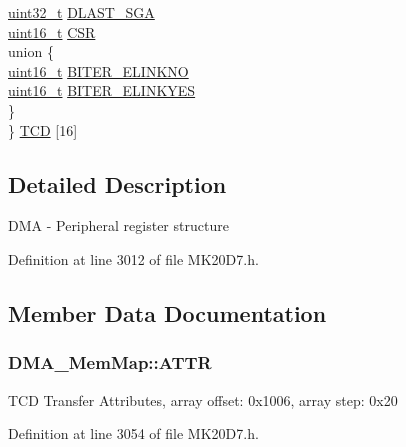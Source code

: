 \begin{DoxyCompactItemize}
\begin{tabbing}
\>\hyperlink{_p_e___types_8h_a33594304e786b158f3fb30289278f5af}{uint32\_t} \hyperlink{struct_d_m_a___mem_map_ace5b1452402cb8cd1863c10b0b8dc8bc}{DLAST\_SGA}\\
\>\hyperlink{_p_e___types_8h_a1f1825b69244eb3ad2c7165ddc99c956}{uint16\_t} \hyperlink{struct_d_m_a___mem_map_a3acaffbe8a6ec6cf0ba28d9e77a52aca}{CSR}\\
\>union \{\\
\>\>\hyperlink{_p_e___types_8h_a1f1825b69244eb3ad2c7165ddc99c956}{uint16\_t} \hyperlink{struct_d_m_a___mem_map_ab5a88bd570bf66e4186b2363c84bd015}{BITER\_ELINKNO}\\
\>\>\hyperlink{_p_e___types_8h_a1f1825b69244eb3ad2c7165ddc99c956}{uint16\_t} \hyperlink{struct_d_m_a___mem_map_a352e7d2300de3264c6a49f1ce813e149}{BITER\_ELINKYES}\\
\>\} \\
\} \hyperlink{struct_d_m_a___mem_map_a4c6dc939894da03763acff98bd17fa1c}{TCD} \mbox{[}16\mbox{]}\\

\end{tabbing}\end{DoxyCompactItemize}


\subsection{Detailed Description}
D\+MA -\/ Peripheral register structure 

Definition at line 3012 of file M\+K20\+D7.\+h.



\subsection{Member Data Documentation}
\subsubsection[{\texorpdfstring{A\+T\+TR}{ATTR}}]{ D\+M\+A\+\_\+\+Mem\+Map\+::\+A\+T\+TR}\hypertarget{struct_d_m_a___mem_map_ad79f464644f5998377c1a7f63fdaaa6c}{}\label{struct_d_m_a___mem_map_ad79f464644f5998377c1a7f63fdaaa6c}
T\+CD Transfer Attributes, array offset\+: 0x1006, array step\+: 0x20 

Definition at line 3054 of file M\+K20\+D7.\+h.

